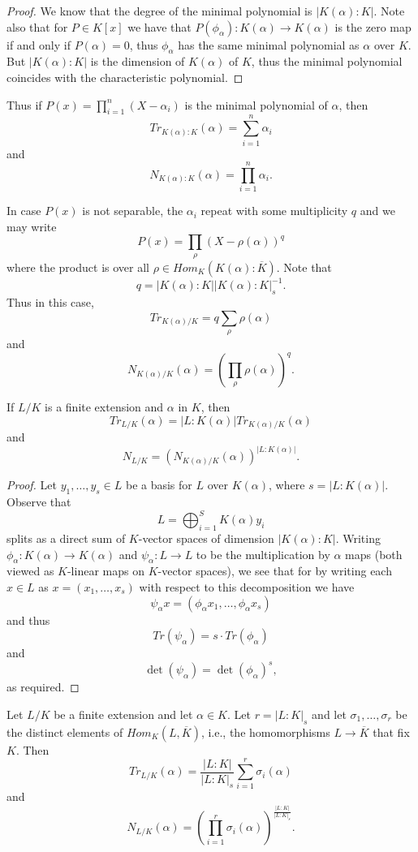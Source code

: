 \documentclass[twoside, a4paper, 10pt]{amsart}
\begin{document}
\begin{proof} We know that the degree of the minimal polynomial is $|K(\alpha):K|$. Note also that for $P \in K[x]$ we have that $P(\phi_{\alpha}):K(\alpha) \to K(\alpha)$ is the zero map if and only if $P(\alpha) = 0$, thus $\phi_{\alpha}$ has the same minimal polynomial as $\alpha$ over $K$. But $|K(\alpha):K|$ is the dimension of $K(\alpha)$ of $K$, thus the minimal polynomial coincides with the characteristic polynomial.\end{proof}

Thus if $P(x) = \prod_{i=1}^n (X - \alpha_i)$ is the minimal polynomial of $\alpha$, then $$Tr_{K(\alpha):K}(\alpha) = \sum_{i=1}^n \alpha_i$$ and $$N_{K(\alpha):K}(\alpha) = \prod_{i=1}^n \alpha_i.$$

In case $P(x)$ is not separable, the $\alpha_i$ repeat with some multiplicity $q$ and we may write $$P(x) = \prod_{\rho} (X-\rho(\alpha))^q$$ where the product is over all $\rho \in Hom_{K}(K(\alpha): \overline{K})$. Note that $$q = |K(\alpha):K||K(\alpha):K|_s^{-1}.$$ Thus in this case, $$Tr_{K(\alpha)/K} = q \sum_{\rho} \rho(\alpha)$$ and $$N_{K(\alpha)/K}(\alpha) = \left(\prod_{\rho} \rho(\alpha) \right)^q.$$


\begin{prop} If $L/K$ is a finite extension and $\alpha$ in $K$, then $$Tr_{L/K}(\alpha) = |L:K(\alpha)| Tr_{K(\alpha)/K} (\alpha)$$ and $$N_{L/K} = \left( N_{K(\alpha)/K}(\alpha) \right)^{|L:K(\alpha)|}.$$

\end{prop}

\begin{proof} Let $y_1, \ldots, y_s \in L$ be a basis for $L$ over $K(\alpha)$, where $s = |L:K(\alpha)|$. Observe that $$L = \bigoplus_{i=1}^S K(\alpha) y_i$$ splits as a direct sum of $K$-vector spaces of dimension $|K(\alpha):K|$. Writing $\phi_{\alpha}:K(\alpha) \to K(\alpha)$ and $\psi_{\alpha}:L \to L$ to be the multiplication by $\alpha$ maps (both viewed as $K$-linear maps on $K$-vector spaces), we see that for by writing each $x \in L$ as $x = (x_1, \ldots, x_s)$ with respect to this decomposition we have $$\psi_{\alpha} x = (\phi_{\alpha} x_1, \ldots, \phi_{\alpha} x_s)$$ and thus $$Tr (\psi_{\alpha}) = s \cdot Tr (\phi_{\alpha})$$ and $$\operatorname{det} (\psi_{\alpha}) = \operatorname{det} (\phi_{\alpha})^s,$$ as required. \end{proof}

\begin{thm} Let $L/K$ be a finite extension and let $\alpha \in K$. Let $r=|L:K|_s$ and let $\sigma_1, \ldots, \sigma_r$ be the distinct elements of $Hom_K(L, \overline{K})$, i.e., the homomorphisms $L \to \overline{K}$ that fix $K$. Then $$Tr_{L/K}(\alpha) = \frac{|L:K|}{|L:K|_s} \sum_{i=1}^r \sigma_i (\alpha)$$ and $$N_{L/K}(\alpha) = \left(\prod_{i=1}^r \sigma_i (\alpha) \right ) ^{\frac{|L:K|}{|L:K|_s}}.$$

\end{thm}
\end{document}

